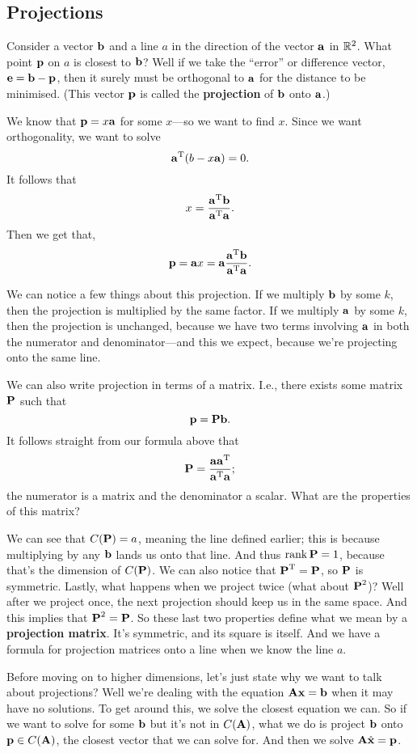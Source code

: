 \subsection{Projections}

Consider a vector $\vb$ and a line $a$ in the direction of the vector $\va$ in $\RR^2$. What point $\vp$ on $a$ is closest to $\vb$? Well if we take the ``error'' or difference vector, $\ve = \vb - \vp$, then it surely must be orthogonal to $\va$ for the distance to be minimised. (This vector $\vp$ is called the \textbf{projection} of $\vb$ onto $\va$.)

We know that $\vp = x\va$ for some $x$---so we want to find $x$. Since we want orthogonality, we want to solve
\[ \T\va (b - x\va) = 0. \]
It follows that
\[ x = \frac{\T\va \vb}{\T\va \va}. \]
Then we get that,
\[ \vp = \va x = \va \frac{\T\va \vb}{\T\va \va}. \]

We can notice a few things about this projection. If we multiply $\vb$ by some $k$, then the projection is multiplied by the same factor. If we multiply $\va$ by some $k$, then the projection is unchanged, because we have two terms involving $\va$ in both the numerator and denominator---and this we expect, because we're projecting onto the same line.

We can also write projection in terms of a matrix. I.e., there exists some matrix $\mP$ such that
\[ \vp = \mP \vb. \]
It follows straight from our formula above that 
\[ \mP = \frac{\va \T\va}{\T\va \va}; \]
the numerator is a matrix and the denominator a scalar. What are the properties of this matrix? 

We can see that $C(\mP) = a$, meaning the line defined earlier; this is because multiplying by any $\vb$ lands us onto that line. And thus $\Rank \mP = 1$, because that's the dimension of $C(\mP)$. We can also notice that $\T\mP=\mP$, so $\mP$ is symmetric. Lastly, what happens when we project twice (what about $\mP^2$)? Well after we project once, the next projection should keep us in the same space. And this implies that $\mP^2 = \mP$. So these last two properties define what we mean by a \textbf{projection matrix}. It's symmetric, and its square is itself. And we have a formula for projection matrices onto a line when we know the line $a$. 

\brm
Before moving on to higher dimensions, let's just state why we want to talk about projections? Well we're dealing with the equation $\mA\vx = \vb$ when it may have no solutions. To get around this, we solve the closest equation we can. So if we want to solve for some $\vb$ but it's not in $C(\mA)$, what we do is project $\vb$ onto $\vp \in C(\mA)$, the closest vector that we can solve for. And then we solve $\mA \hat{\vx} = \vp$. 
\erm 


